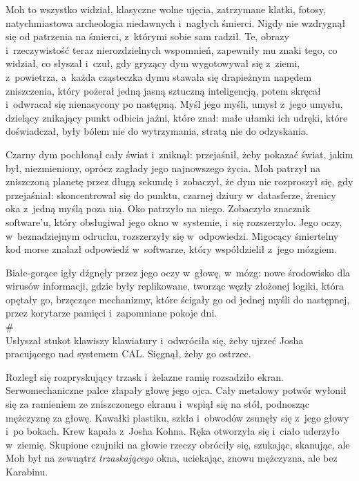 \documentclass[oneside,polish,11pt,sfheadings]{mwbk}
\begin{document}
Moh to wszystko widział, klasyczne wolne ujęcia, zatrzymane klatki,
fotosy, natychmiastowa archeologia niedawnych i~nagłych śmierci. Nigdy
nie wzdrygnął się od patrzenia na śmierci, z~którymi sobie sam radził.
Te, obrazy i~rzeczywistość teraz nierozdzielnych wspomnień, zapewniły mu
znaki tego, co widział, co słyszał i~czuł, gdy gryzący dym wygotowywał
się z~ziemi, z~powietrza, a~każda cząsteczka dymu stawała się drapieżnym
napędem zniszczenia, który pożerał jedną jasną sztuczną inteligencją,
potem skręcał i~odwracał się nienasycony po następną. Myśl jego myśli,
umysł z~jego umysłu, dzielący znikający punkt odbicia jaźni, które znał:
małe ułamki ich udręki, które doświadczał, były bólem nie do
wytrzymania, stratą nie do odzyskania.

Czarny dym pochłonął cały świat i~zniknął: przejaśnił, żeby pokazać
świat, jakim był, niezmieniony, oprócz zagłady jego najnowszego życia.
Moh patrzył na zniszczoną planetę przez długą sekundę i~zobaczył, że dym
nie rozproszył się, gdy przejaśniał: skoncentrował się do punktu,
czarnej dziury w~datasferze, źrenicy oka z~jedną myślą poza nią. Oko
patrzyło na niego. Zobaczyło znacznik software'u, który obsługiwał jego
okno w~systemie, i~się rozszerzyło. Jego oczy, w~beznadziejnym odruchu,
rozszerzyły się w~odpowiedzi. Migocący śmiertelny kod morse znalazł
odpowiedź w~softwarze, który współdzielił z~jego mózgiem.

Białe-gorące igły dźgnęły przez jego oczy w~głowę, w~mózg: nowe
środowisko dla wirusów informacji, gdzie były replikowane, tworząc węzły
złożonej logiki, która opętały go, brzęczące mechanizmy, które ścigały
go od jednej myśli do następnej, przez korytarze pamięci i~zapomniane
pokoje dni.\\

\#\\

Usłyszał stukot klawiszy klawiatury i~odwróciła się, żeby ujrzeć Josha
pracującego nad systemem CAL. Sięgnął, żeby go ostrzec.

Rozległ się rozpryskujący trzask i~żelazne ramię rozsadziło ekran.
Serwomechaniczne palce złapały głowę jego ojca. Cały metalowy potwór
wyłonił się za ramieniem ze zniszczonego ekranu i~wspiął się na stół,
podnosząc mężczyznę za głowę. Kawałki plastiku, szkła i~obwodów zsunęły
się z~jego głowy i~po bokach. Krew kapała z~Josha Kohna. Ręka otworzyła
się i~ciało uderzyło w~ziemię. Skupione czujniki na głowie rzeczy
obróciły się, szukając, skanując, ale Moh był na zewnątrz
\emph{trzaskającego} okna, uciekając, znowu mężczyzna, ale bez Karabinu.\\
\end{document}
